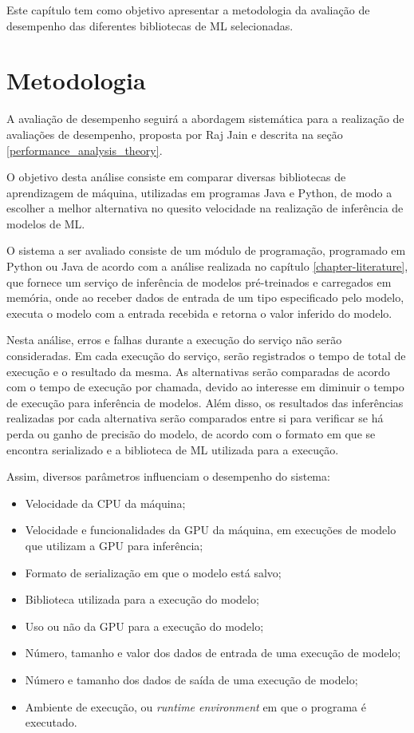 Este capítulo tem como objetivo apresentar a metodologia da avaliação de desempenho das diferentes bibliotecas de ML selecionadas.

\section{Metodologia}

A avaliação de desempenho seguirá a abordagem sistemática para a realização de avaliações de desempenho, proposta por Raj Jain e descrita na seção \ref{performance_analysis_theory}.

O objetivo desta análise consiste em comparar diversas bibliotecas de aprendizagem de máquina, utilizadas em programas Java e Python, de modo a escolher a melhor alternativa no quesito velocidade na realização de inferência de modelos de ML.

O sistema a ser avaliado consiste de um módulo de programação, programado em Python ou Java de acordo com a análise realizada no capítulo \ref{chapter-literature}, que fornece um serviço de inferência de modelos pré-treinados e carregados em memória, onde ao receber dados de entrada de um tipo especificado pelo modelo, executa o modelo com a entrada recebida e retorna o valor inferido do modelo.

Nesta análise, erros e falhas durante a execução do serviço não serão consideradas. Em cada execução do serviço, serão registrados o tempo de total de execução e o resultado da mesma. As alternativas serão comparadas de acordo com o tempo de execução por chamada, devido ao interesse em diminuir o tempo de execução para inferência de modelos. Além disso, os resultados das inferências realizadas por cada alternativa serão comparados entre si para verificar se há perda ou ganho de precisão do modelo, de acordo com o formato em que se encontra serializado e a biblioteca de ML utilizada para a execução.

Assim, diversos parâmetros influenciam o desempenho do sistema:

\begin{itemize}
  \item Velocidade da CPU da máquina;
  \item Velocidade e funcionalidades da GPU da máquina, em execuções de modelo que utilizam a GPU para inferência;
  \item Formato de serialização em que o modelo está salvo;
  \item Biblioteca utilizada para a execução do modelo;
  \item Uso ou não da GPU para a execução do modelo;
  \item Número, tamanho e valor dos dados de entrada de uma execução de modelo;
  \item Número e tamanho dos dados de saída de uma execução de modelo;
  \item Ambiente de execução, ou \textit{runtime environment} em que o programa é executado.
\end{itemize}

